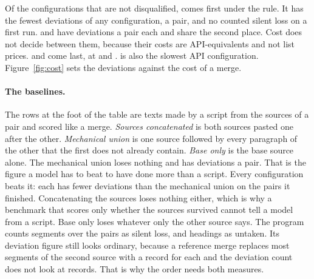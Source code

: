 Of the  configurations that are not disqualified, \texttt{} comes first under the rule. It has the fewest deviations of any configuration,  a pair, and no counted silent loss on a first run. \texttt{} and \texttt{} have  deviations a pair each and share the second place. Cost does not decide between them, because their costs are API-equivalents and not list prices. \texttt{} and \texttt{} come last, at  and . \texttt{} is also the slowest API configuration. Figure~\ref{fig:cost} sets the deviations against the cost of a merge.

\paragraph{The baselines.} The rows at the foot of the table are texts made by a script from the sources of a pair and scored like a merge. \emph{Sources concatenated} is both sources pasted one after the other. \emph{Mechanical union} is one source followed by every paragraph of the other that the first does not already contain. \emph{Base only} is the base source alone. The mechanical union loses nothing and has  deviations a pair. That is the figure a model has to beat to have done more than a script. Every configuration beats it: each has fewer deviations than the mechanical union on the pairs it finished. Concatenating the sources loses nothing either, which is why a benchmark that scores only whether the sources survived cannot tell a model from a script. Base only loses whatever only the other source says. The program counts  segments over the  pairs as silent loss, and  headings as untaken. Its deviation figure still looks ordinary, because a reference merge replaces most segments of the second source with a record for each and the deviation count does not look at records. That is why the order needs both measures.



